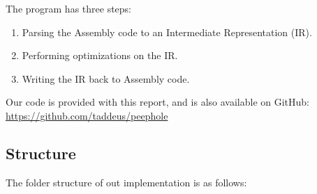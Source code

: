 \documentclass[10pt,a4paper]{article}
\begin{document}
The program has three steps:
\begin{enumerate}
    \item Parsing the Assembly code to an Intermediate Representation (IR).
    \item Performing optimizations on the IR.
    \item Writing the IR back to Assembly code.
\end{enumerate}

Our code is provided with this report, and is also available on GitHub: \\
\url{https://github.com/taddeus/peephole}

\subsection{Structure}

The folder structure of out implementation is as follows:
\end{document}
